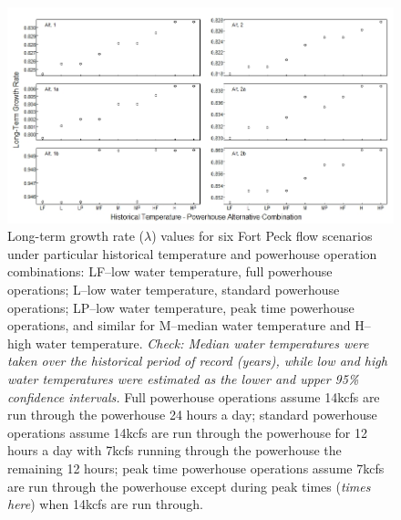\documentclass[12pt]{article}
\begin{document}
\begin{figure}[h]
\centering
\hspace*{-0.5in}\includegraphics[width=7.5in]{NEPA_Fig_9-Year85-SA}
\caption{Long-term growth rate ($\lambda$) values for six Fort Peck flow scenarios under particular historical temperature and powerhouse operation combinations: LF--low water temperature, full powerhouse operations; L--low water temperature, standard powerhouse operations; LP--low water temperature, peak time powerhouse operations, and similar for M--median water temperature and H--high water temperature.  \textit{Check:  Median water temperatures were taken over the historical period of record (years), while low and high water temperatures were estimated as the lower and upper 95\% confidence intervals.} Full powerhouse operations assume 14kcfs are run through the powerhouse 24 hours a day; standard powerhouse operations assume 14kcfs are run through the powerhouse for 12 hours a day with 7kcfs running through the powerhouse the remaining 12 hours; peak time powerhouse operations assume 7kcfs are run through the powerhouse except during peak times (\textit{times here}) when 14kcfs are run through.}
\label{SA85}
\end{figure}
\end{document}
